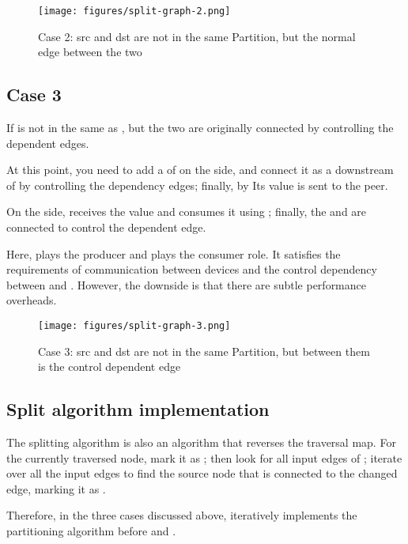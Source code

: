 \begin{figure}[H]
  \centering
  \texttt{[image: figures/split-graph-2.png]}
  \caption{Case 2: src and dst are not in the same Partition, but the normal edge between the two}
  \label{fig:split-graph-2}
\end{figure}


\subsection{Case 3}
If  is not in the same  as , but the two are originally connected by controlling the dependent edges.

At this point, you need to add a  of  on the  side, and connect it as a downstream of  by controlling the dependency edges; finally, by  Its value is sent to the peer.

On the  side,  receives the value and consumes it using ; finally, the  and  are connected to control the dependent edge.

Here,  plays the producer and  plays the consumer role. It satisfies the requirements of communication between devices and the control dependency between  and . However, the downside is that there are subtle performance overheads.

\begin{figure}[H]
  \centering
  \texttt{[image: figures/split-graph-3.png]}
  \caption{Case 3: src and dst are not in the same Partition, but between them is the control dependent edge}
  \label{fig:split-graph-3}
\end{figure}


\subsection{Split algorithm implementation}
The splitting algorithm is also an algorithm that reverses the traversal map. For the currently traversed node, mark it as ; then look for all input edges of ; iterate over all the input edges to find the source node that is connected to the changed edge, marking it as .

Therefore, in the three cases discussed above, iteratively implements the  partitioning algorithm before  and .

